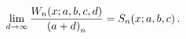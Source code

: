 \[\lim_{d\to\infty}\frac{\mathop{W_{n}\/}\nolimits\!\left(x;a,b,c,d\right)}{%
\left(a+d\right)_{n}}=\mathop{S_{n}\/}\nolimits\!\left(x;a,b,c\right).\]